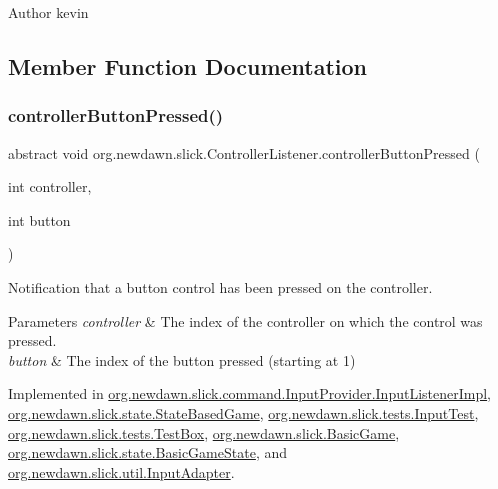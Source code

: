 \begin{DoxyAuthor}{Author}
kevin 
\end{DoxyAuthor}


\subsection{Member Function Documentation}
\mbox{\label{interfaceorg_1_1newdawn_1_1slick_1_1_controller_listener_ae6feac165a8d0eded01f38de12f239ff}} 
\subsubsection{\texorpdfstring{controller\+Button\+Pressed()}{controllerButtonPressed()}}
{\footnotesize\ttfamily abstract void org.\+newdawn.\+slick.\+Controller\+Listener.\+controller\+Button\+Pressed (\begin{DoxyParamCaption}\item[{int}]{controller,  }\item[{int}]{button }\end{DoxyParamCaption})\hspace{0.3cm}{\ttfamily [abstract]}}

Notification that a button control has been pressed on the controller.


\begin{DoxyParams}{Parameters}
{\em controller} & The index of the controller on which the control was pressed. \\
\hline
{\em button} & The index of the button pressed (starting at 1) \\
\hline
\end{DoxyParams}


Implemented in \mbox{\hyperlink{classorg_1_1newdawn_1_1slick_1_1command_1_1_input_provider_1_1_input_listener_impl_a73f1147258038fc20b2a61aebc2096a3}{org.\+newdawn.\+slick.\+command.\+Input\+Provider.\+Input\+Listener\+Impl}}, \mbox{\hyperlink{classorg_1_1newdawn_1_1slick_1_1state_1_1_state_based_game_a86b1ef633750d400262209bd8d6c2059}{org.\+newdawn.\+slick.\+state.\+State\+Based\+Game}}, \mbox{\hyperlink{classorg_1_1newdawn_1_1slick_1_1tests_1_1_input_test_a7b7b3c980b5b222fbcec4eb5ff5b2590}{org.\+newdawn.\+slick.\+tests.\+Input\+Test}}, \mbox{\hyperlink{classorg_1_1newdawn_1_1slick_1_1tests_1_1_test_box_a26fb5a8be9ff46cb1a0d0e4bd0cff1f0}{org.\+newdawn.\+slick.\+tests.\+Test\+Box}}, \mbox{\hyperlink{classorg_1_1newdawn_1_1slick_1_1_basic_game_a9d83c85e4046945a3459debf55079697}{org.\+newdawn.\+slick.\+Basic\+Game}}, \mbox{\hyperlink{classorg_1_1newdawn_1_1slick_1_1state_1_1_basic_game_state_ace9fde4bc57f608d957efc97667b8a6d}{org.\+newdawn.\+slick.\+state.\+Basic\+Game\+State}}, and \mbox{\hyperlink{classorg_1_1newdawn_1_1slick_1_1util_1_1_input_adapter_ad51a716fce13f062b7bef542c2d7641a}{org.\+newdawn.\+slick.\+util.\+Input\+Adapter}}.

